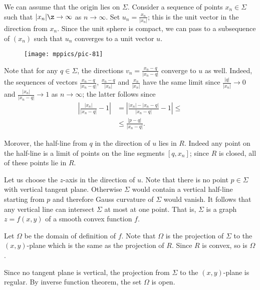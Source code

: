 We can assume that the origin lies on $\Sigma$.
Consider a sequence of points $x_n\in \Sigma$ such that $|x_n|\z\to \infty$ as $n\to \infty$.
Set $u_n=\tfrac{x_n}{|x_n|}$; this is the unit vector in the direction from $x_n$.
Since the unit sphere is compact, we can pass to a subsequence of $(x_n)$ such that $u_n$ converges to a unit vector $u$.

\begin{wrapfigure}[15]{o}{28 mm}
\vskip-0mm
\centering
\texttt{[image: mppics/pic-81]}
\vskip-0mm
\end{wrapfigure}

Note that for any $q\in \Sigma$, the directions $v_n=\tfrac{x_n-q}{|x_n-q|}$ converge to $u$ as well.
Indeed, the sequences of vectors $\tfrac{x_n-q}{|x_n-q|}$, $\tfrac{x_n-q}{|x_n|}$ and 
$\tfrac{x_n}{|x_n|}$ have the same limit since $\tfrac{|q|}{|x_n|}\to 0$
and $\tfrac{|x_n|}{|x_n-q|}\to 1$ as $n\to \infty$;
the latter follows since
\begin{align*}
|\tfrac{|x_n|}{|x_n-q|}-1|&=|\tfrac{|x_n|-|x_n-q|}{|x_n-q|}-1|\le
\\
&\le\tfrac{|p-q|}{|x_n-q|}.
\end{align*}

Morover, the half-line from $q$ in the direction of $u$ lies in $R$.
Indeed any point on the half-line is a limit of points on the line segments $[q,x_n]$;
since $R$ is closed, all of these points lie in $R$.


Let us choose the $z$-axis in the direction of $u$.
Note that there is no point $p\in\Sigma$ with vertical tangent plane.
Otherwise $\Sigma$ would contain a vertical half-line starting from $p$ and therefore Gauss curvature of $\Sigma$ would vanish.
It follows that any vertical line can intersect $\Sigma$ at most at one point.
That is, $\Sigma$ is a graph $z=f(x,y)$ of a smooth convex function $f$.

Let $\Omega$ be the domain of definition of $f$.
Note that $\Omega$ is the projection of $\Sigma$ to the $(x,y)$-plane 
which is the same as the projection of $R$.
Since $R$ is convex, so is $\Omega$.

Since no tangent plane is vertical, the projection from $\Sigma$ to the $(x,y)$-plane is regular.
By inverse function theorem, the set $\Omega$ is open.\qeds

 




 


























